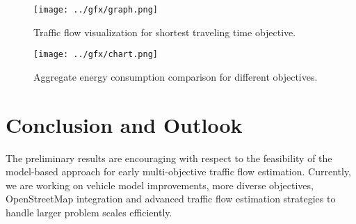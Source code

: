 \documentclass[conference]{../cls/IEEEtran}
\begin{document}
\begin{figure}[t!]
	\centering
	\texttt{[image: ../gfx/graph.png]}
	\caption{Traffic flow visualization for shortest traveling time objective.}
	\label{figure:graph}
\end{figure}

\begin{figure}[t!]
	\centering
	\texttt{[image: ../gfx/chart.png]}
	\caption{Aggregate energy consumption comparison for different objectives.}
	\label{figure:chart}
\end{figure}

\section{Conclusion and Outlook}

The preliminary results are encouraging with respect to the feasibility of the model-based approach for early multi-objective traffic flow estimation. Currently, we are working on vehicle model improvements, more diverse objectives, OpenStreetMap integration and advanced traffic flow estimation strategies to handle larger problem scales efficiently.



\end{document}
